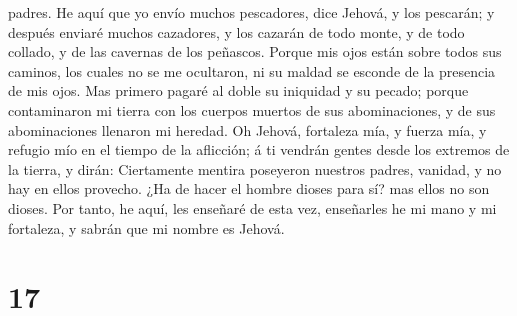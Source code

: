 padres.  He aquí que yo envío muchos pescadores, dice
Jehová, y los pescarán; y después enviaré muchos cazadores, y los
cazarán de todo monte, y de todo collado, y de las cavernas de los
peñascos.  Porque mis ojos están sobre todos sus caminos,
los cuales no se me ocultaron, ni su maldad se esconde de la presencia
de mis ojos.  Mas primero pagaré al doble su iniquidad y
su pecado; porque contaminaron mi tierra con los cuerpos muertos de sus
abominaciones, y de sus abominaciones llenaron mi heredad.
 Oh Jehová, fortaleza mía, y fuerza mía, y refugio mío en
el tiempo de la aflicción; á ti vendrán gentes desde los extremos de la
tierra, y dirán: Ciertamente mentira poseyeron nuestros padres, vanidad,
y no hay en ellos provecho.  ¿Ha de hacer el hombre
dioses para sí? mas ellos no son dioses.  Por tanto, he
aquí, les enseñaré de esta vez, enseñarles he mi mano y mi fortaleza, y
sabrán que mi nombre es Jehová.

\hypertarget{section-16}{%
\section{17}\label{section-16}}

